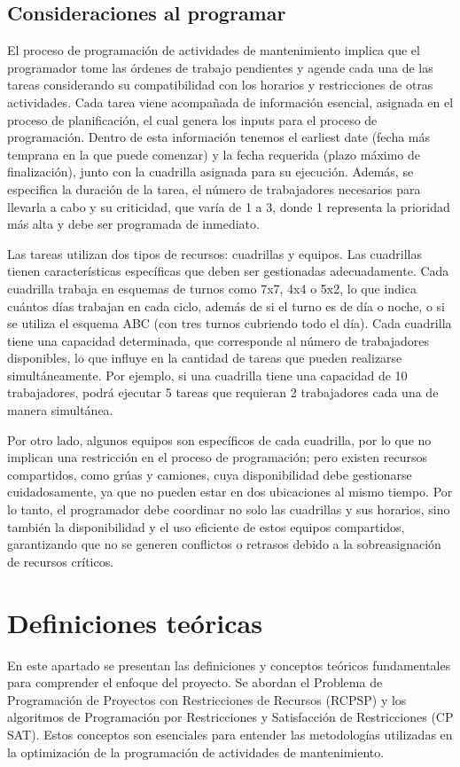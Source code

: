 \documentclass{article}
\begin{document}
\subsection{Consideraciones al programar}
El proceso de programación de actividades de mantenimiento implica que el programador tome las órdenes de trabajo pendientes y agende cada una de las tareas considerando su compatibilidad con los horarios y restricciones de otras actividades. Cada tarea viene acompañada de información esencial, asignada en el proceso de planificación, el cual genera los inputs para el proceso de programación. Dentro de esta información tenemos el earliest date (fecha más temprana en la que puede comenzar) y la fecha requerida (plazo máximo de finalización), junto con la cuadrilla asignada para su ejecución. Además, se especifica la duración de la tarea, el número de trabajadores necesarios para llevarla a cabo y su criticidad, que varía de 1 a 3, donde 1 representa la prioridad más alta y debe ser programada de inmediato.

Las tareas utilizan dos tipos de recursos: cuadrillas y equipos. Las cuadrillas tienen características específicas que deben ser gestionadas adecuadamente. Cada cuadrilla trabaja en esquemas de turnos como 7x7, 4x4 o 5x2, lo que indica cuántos días trabajan en cada ciclo, además de si el turno es de día o noche, o si se utiliza el esquema ABC (con tres turnos cubriendo todo el día). Cada cuadrilla tiene una capacidad determinada, que corresponde al número de trabajadores disponibles, lo que influye en la cantidad de tareas que pueden realizarse simultáneamente. Por ejemplo, si una cuadrilla tiene una capacidad de 10 trabajadores, podrá ejecutar 5 tareas que requieran 2 trabajadores cada una de manera simultánea.

Por otro lado, algunos equipos son específicos de cada cuadrilla, por lo que no implican una restricción en el proceso de programación; pero existen recursos compartidos, como grúas y camiones, cuya disponibilidad debe gestionarse cuidadosamente, ya que no pueden estar en dos ubicaciones al mismo tiempo. Por lo tanto, el programador debe coordinar no solo las cuadrillas y sus horarios, sino también la disponibilidad y el uso eficiente de estos equipos compartidos, garantizando que no se generen conflictos o retrasos debido a la sobreasignación de recursos críticos.

\section{Definiciones teóricas}
En este apartado se presentan las definiciones y conceptos teóricos fundamentales para comprender el enfoque del proyecto. Se abordan el Problema de Programación de Proyectos con Restricciones de Recursos (RCPSP) y los algoritmos de Programación por Restricciones y Satisfacción de Restricciones (CP SAT). Estos conceptos son esenciales para entender las metodologías utilizadas en la optimización de la programación de actividades de mantenimiento.
\end{document}
